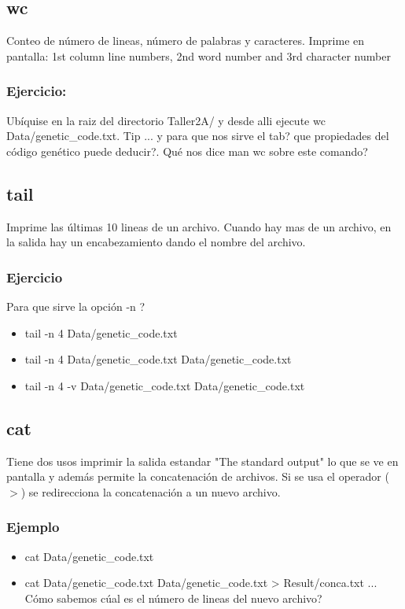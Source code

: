 \documentclass[10pt]{article}
\begin{document}
\subsection*{wc}
Conteo de número de lineas, número de palabras y caracteres. Imprime en pantalla: 1st column line numbers, 2nd word number and 3rd character number
\subsubsection{Ejercicio:}
Ubíquise en la raiz del directorio Taller2A/ y desde alli ejecute
wc Data/genetic\_code.txt. Tip ... y para que nos sirve el tab? que propiedades del código genético puede deducir?. Qué nos dice man wc sobre este comando?
\subsection{tail}
Imprime las últimas 10 lineas de un archivo. Cuando hay mas de un archivo, en la salida hay un encabezamiento  dando el nombre del archivo.
\subsubsection{Ejercicio}
Para que sirve la opción -n ?
\begin{itemize}
\item tail -n 4 Data/genetic\_code.txt
\item tail -n 4 Data/genetic\_code.txt Data/genetic\_code.txt
\item tail -n 4 -v  Data/genetic\_code.txt Data/genetic\_code.txt
\end{itemize}


\subsection{cat}
Tiene dos usos imprimir la salida estandar "The standard output" lo que se ve en pantalla y además permite la concatenación de archivos.  Si se usa el operador ($>$) se redirecciona la concatenación a un nuevo archivo.
\subsubsection{Ejemplo}
\begin{itemize}
\item cat Data/genetic\_code.txt
\item cat Data/genetic\_code.txt Data/genetic\_code.txt > Result/conca.txt ...  Cómo sabemos cúal es el número de lineas del nuevo archivo?
\end{itemize}
\end{document}
